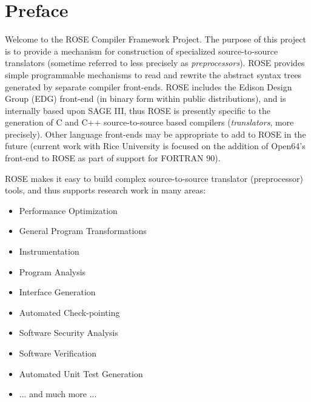 
\chapter*{Preface}


   Welcome to the ROSE Compiler Framework Project.  The purpose of this project is to 
provide a mechanism for construction of specialized source-to-source translators 
(sometime referred to less precisely as {\em preprocessors}).  ROSE provides 
simple programmable mechanisms to read and rewrite the abstract syntax trees generated 
by separate compiler front-ends.  ROSE includes the Edison Design Group (EDG) 
front-end (in binary form within public
distributions), and is internally based upon SAGE III, thus ROSE is presently specific 
to the generation of C and C++ source-to-source based compilers ({\em translators}, 
more precisely).  Other language front-ends may be appropriate to add to ROSE in 
the future (current work with Rice University is focused on the addition of Open64's
front-end to ROSE as part of support for FORTRAN 90).

   ROSE makes it easy to build complex source-to-source translator
(preprocessor) tools, and thus supports research work in many areas:
\begin{itemize}
   \item Performance Optimization
   \item General Program Transformations
   \item Instrumentation
   \item Program Analysis
   \item Interface Generation
   \item Automated Check-pointing
   \item Software Security Analysis
   \item Software Verification
   \item Automated Unit Test Generation
   \item ... and much more ...
\end{itemize}


